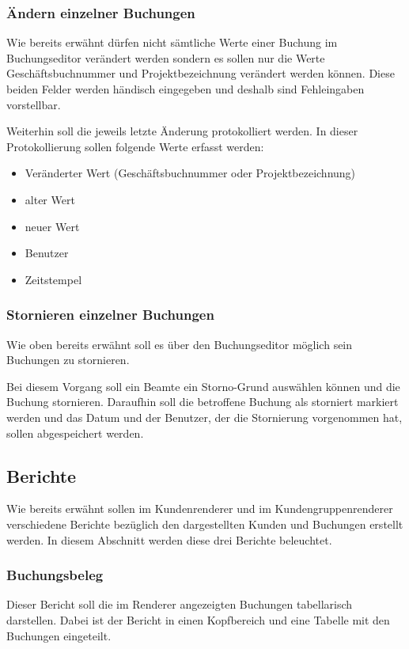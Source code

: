 \subsubsection{Ändern einzelner Buchungen} \label{subsubsec:aendern_buchung}
Wie bereits erwähnt dürfen nicht sämtliche Werte einer Buchung im Buchungseditor verändert werden sondern es sollen nur die Werte Geschäftsbuchnummer und Projektbezeichnung verändert werden können.
Diese beiden Felder werden händisch eingegeben und deshalb sind Fehleingaben vorstellbar.

Weiterhin soll die jeweils letzte Änderung protokolliert werden. In dieser Protokollierung  sollen folgende Werte erfasst werden:
\begin{itemize}
\item Veränderter Wert (Geschäftsbuchnummer oder Projektbezeichnung)
\item alter Wert
\item neuer Wert
\item Benutzer
\item Zeitstempel
\end{itemize}

\subsubsection{Stornieren einzelner Buchungen} \label{subsubsec:storno_buchung}
Wie oben bereits erwähnt soll es über den Buchungseditor möglich sein Buchungen zu stornieren.

Bei diesem Vorgang soll ein Beamte ein Storno-Grund auswählen können und die Buchung stornieren. Daraufhin soll die betroffene Buchung als storniert markiert werden und das Datum und der Benutzer, der die Stornierung vorgenommen hat, sollen abgespeichert werden.

\subsection{Berichte}
Wie bereits erwähnt sollen im Kundenrenderer und im Kundengruppenrenderer verschiedene Berichte bezüglich den dargestellten Kunden und Buchungen erstellt werden. In diesem Abschnitt werden diese drei Berichte beleuchtet. 
\subsubsection{Buchungsbeleg}
Dieser Bericht soll die im Renderer angezeigten Buchungen tabellarisch darstellen.
Dabei ist der Bericht in einen Kopfbereich und eine Tabelle mit den Buchungen eingeteilt.

